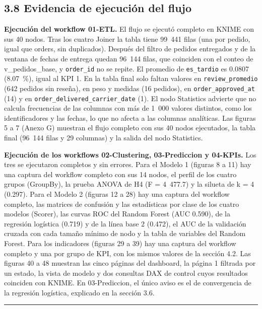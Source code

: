 \documentclass[a4paper,stu,12pt,donotrepeattitle,floatsintext]{apa7}
\begin{document}
\subsection{3.8 Evidencia de ejecución del flujo}
\textbf{Ejecución del workflow 01-ETL.} El flujo se ejecutó completo en KNIME con sus 40 nodos. Tras los cuatro Joiner la tabla tiene 99~441 filas (una por pedido, igual que orders, sin duplicados). Después del filtro de pedidos entregados y de la ventana de fechas de entrega quedan 96~144 filas, que coinciden con el conteo de v\_\allowbreak{}pedidos\_\allowbreak{}base, y \texttt{order\_\allowbreak{}id} no se repite. El promedio de \texttt{es\_\allowbreak{}tardio} es 0.0807 (8.07~\%), igual al KPI 1. En la tabla final solo faltan valores en \texttt{review\_\allowbreak{}promedio} (642 pedidos sin reseña), en peso y medidas (16 pedidos), en \texttt{order\_\allowbreak{}approved\_\allowbreak{}at} (14) y en \texttt{order\_\allowbreak{}delivered\_\allowbreak{}carrier\_\allowbreak{}date} (1). El nodo Statistics advierte que no calcula frecuencias de las columnas con más de 1~000 valores distintos, como los identificadores y las fechas, lo que no afecta a las columnas analíticas. Las figuras 5 a 7 (Anexo G) muestran el flujo completo con sus 40 nodos ejecutados, la tabla final (96~144 filas y 29 columnas) y la salida del nodo Statistics.

\textbf{Ejecución de los workflows 02-Clustering, 03-Prediccion y 04-KPIs.} Los tres se ejecutaron completos y sin errores. Para el Modelo 1 (figuras 8 a 11) hay una captura del workflow completo con sus 14 nodos, el perfil de los cuatro grupos (GroupBy), la prueba ANOVA de H4 (F = 4~477.7) y la silueta de k = 4 (0.297). Para el Modelo 2 (figuras 12 a 28) hay una captura del workflow completo, las matrices de confusión y las estadísticas por clase de los cuatro modelos (Scorer), las curvas ROC del Random Forest (AUC 0.590), de la regresión logística (0.719) y de la línea base 2 (0.472), el AUC de la validación cruzada con cada tamaño mínimo de nodo y la tabla de variables del Random Forest. Para los indicadores (figuras 29 a 39) hay una captura del workflow completo y una por grupo de KPI, con los mismos valores de la sección 4.2. Las figuras 40 a 48 muestran las cinco páginas del dashboard, la página 1 filtrada por un estado, la vista de modelo y dos consultas DAX de control cuyos resultados coinciden con KNIME. En 03-Prediccion, el único aviso es el de convergencia de la regresión logística, explicado en la sección 3.6.

\medskip\noindent\rule{\linewidth}{0.4pt}\medskip
\end{document}
